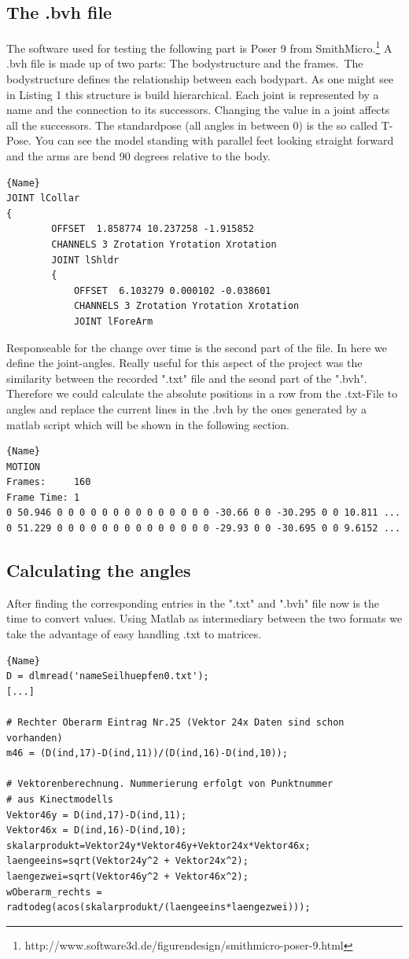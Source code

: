 \documentclass[a4paper]{article}
\begin{document}
\subsection{The .bvh file}
The software used for testing the following part is Poser 9 from SmithMicro.\footnote{http://www.software3d.de/figurendesign/smithmicro-poser-9.html}
A .bvh file is made up of two parts: The bodystructure and the frames.\
The bodystructure defines the relationship between each bodypart. As one might see in
Listing 1 this structure is build hierarchical. Each joint is represented by a name and the connection to its successors. Changing the value in a joint affects all the successors. 
The standardpose (all angles in between 0) is the so called T-Pose. You can see the model standing with parallel feet looking straight forward and the arms are bend 90 degrees relative to the body.
\begin{lstlisting}[caption=.bvh Connected Structure]{Name}
JOINT lCollar
{
		OFFSET	1.858774 10.237258 -1.915852
		CHANNELS 3 Zrotation Yrotation Xrotation
		JOINT lShldr
		{
			OFFSET	6.103279 0.000102 -0.038601
			CHANNELS 3 Zrotation Yrotation Xrotation
			JOINT lForeArm
\end{lstlisting}

Responseable for the change over time is the second part of the file. In here we define the joint-angles. Really useful for this aspect of the project was the similarity between the recorded ".txt" file and the seond part of the ".bvh". Therefore we could calculate the absolute positions in a row from the .txt-File to angles and replace the current lines in the .bvh by the ones generated by a matlab script which will be shown in the following section.
\begin{lstlisting}[caption=Motionpart of .bvh]{Name}
MOTION
Frames:     160
Frame Time: 1                
0 50.946 0 0 0 0 0 0 0 0 0 0 0 0 0 0 -30.66 0 0 -30.295 0 0 10.811 ...
0 51.229 0 0 0 0 0 0 0 0 0 0 0 0 0 0 -29.93 0 0 -30.695 0 0 9.6152 ...
\end{lstlisting}

\subsection{Calculating the angles}
After finding the corresponding entries in the ".txt" and ".bvh" file now is the time to convert values. Using Matlab as  intermediary between the two formats we take the advantage of easy handling .txt to matrices. 

\begin{lstlisting}[caption=Calculating the angle]{Name}
D = dlmread('nameSeilhuepfen0.txt');
[...]

# Rechter Oberarm Eintrag Nr.25 (Vektor 24x Daten sind schon vorhanden)
m46 = (D(ind,17)-D(ind,11))/(D(ind,16)-D(ind,10));

# Vektorenberechnung. Nummerierung erfolgt von Punktnummer 
# aus Kinectmodells
Vektor46y = D(ind,17)-D(ind,11);
Vektor46x = D(ind,16)-D(ind,10);
skalarprodukt=Vektor24y*Vektor46y+Vektor24x*Vektor46x;
laengeeins=sqrt(Vektor24y^2 + Vektor24x^2);
laengezwei=sqrt(Vektor46y^2 + Vektor46x^2); 
wOberarm_rechts = radtodeg(acos(skalarprodukt/(laengeeins*laengezwei)));
\end{lstlisting}
\end{document}
